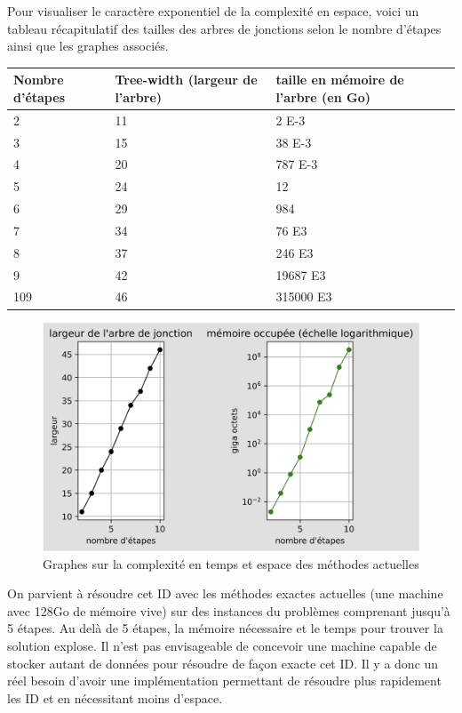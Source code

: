 \documentclass[12pt]{article}
\begin{document}
\pagebreak
Pour visualiser le caractère exponentiel de la complexité en espace, voici un tableau récapitulatif des tailles des arbres de jonctions selon le nombre d'étapes ainsi que les graphes associés.
\bigbreak
\begin{center}
   \begin{tabular}{|p{3cm} || p{3cm} | p{3cm} | }
    \hline
    Nombre d'étapes & Tree-width (largeur de l'arbre) & taille en mémoire de l'arbre (en Go) \\ 
    \hline
    2&11&2 E-3\\
    \hline
    3&15&38 E-3\\
    \hline
    4&20&787 E-3\\
    \hline
    5&24&12\\
    \hline
    6&29&984\\
    \hline
    7&34&76 E3\\
    \hline
    8&37&246 E3\\
    \hline
    9&42&19687 E3\\
    \hline
    109&46&315000 E3\\
    \hline
   \end{tabular}
\end{center}
 \begin{figure}[h]
\centering
\includegraphics[scale=0.2]{docs/ressources_rapport/graphes.png}
\caption{Graphes sur la complexité en temps et espace des méthodes actuelles}
\end{figure}

On parvient à résoudre cet ID avec les méthodes exactes actuelles (une machine avec 128Go de mémoire vive) sur des instances du problèmes comprenant jusqu'à 5 étapes. Au delà de 5 étapes, la mémoire nécessaire et le temps pour trouver la solution explose. \bigbreak
Il n'est pas envisageable de concevoir une machine capable de stocker autant de données pour résoudre de façon exacte cet ID. Il y a donc un réel besoin d'avoir une implémentation permettant de résoudre plus rapidement les ID et en nécessitant moins d'espace.
\bigbreak
\bigbreak
\end{document}
